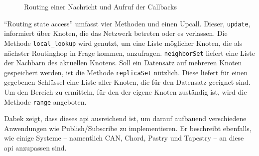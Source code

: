 \begin{figure}[htbp]
\centering
{}
\caption{Routing einer Nachricht und Aufruf der Callbacks}
\label{fig:routing_kbr}
\end{figure}


\enquote{Routing state access} umfasst vier Methoden und einen Upcall. Dieser, \texttt{update}, informiert über Knoten, die das Netzwerk betreten oder es verlassen. Die Methode \texttt{local\_lookup} wird genutzt, um eine Liste möglicher Knoten, die als nächster Routinghop in Frage kommen, anzufragen. \texttt{neighborSet} liefert eine Liste der Nachbarn des aktuellen Knotens. Soll ein Datensatz auf mehreren Knoten gespeichert werden, ist die Methode \texttt{replicaSet} nützlich. Diese liefert für einen gegebenen Schlüssel eine Liste aller Knoten, die für den Datensatz geeignet sind. Um den Bereich zu ermitteln, für den der eigene Knoten zuständig ist, wird die Methode \texttt{range} angeboten.

Dabek zeigt, dass dieses \acf{api} ausreichend ist, um darauf aufbauend verschiedene Anwendungen wie Publish/Subscribe zu implementieren. Er beschreibt ebenfalls, wie einige Systeme -- namentlich CAN, Chord, Pastry und Tapestry -- an diese \ac{api} anzupassen sind.
